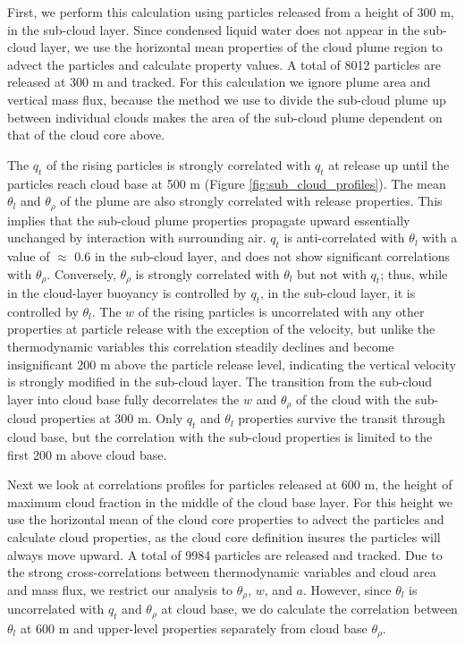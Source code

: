 \documentclass[acp]{copernicus}
\begin{document}
First, we perform this calculation using particles released from a height of 
300 m, in the sub-cloud layer.  Since condensed liquid water does not appear in 
the sub-cloud layer, we use the horizontal mean properties of the cloud plume 
region to advect the particles and calculate property values.  A total of 8012 
particles are released at 300 m and tracked.  For this calculation we ignore 
plume area and vertical mass flux, because the method we use to divide the 
sub-cloud plume up between individual clouds makes the area of the sub-cloud 
plume dependent on that of the cloud core above.

The $q_t$ of the rising particles is strongly correlated with $q_t$ at release 
up until the particles reach cloud base at 500 m (Figure 
\ref{fig:sub_cloud_profiles}).  The mean $\theta_l$ and $\theta_\rho$ of 
the plume are also strongly correlated with release properties.  This implies 
that the sub-cloud plume properties propagate upward essentially unchanged by 
interaction with surrounding air.  $q_t$ is anti-correlated with $\theta_l$ 
with a value of $\approx$ 0.6 in the sub-cloud layer, and does not show 
significant correlations with $\theta_\rho$.  Conversely, $\theta_\rho$ is 
strongly correlated with $\theta_l$ but not with $q_t$; thus, while in the 
cloud-layer buoyancy is controlled by $q_t$, in the sub-cloud layer, it is 
controlled by $\theta_l$.  The $w$ of the rising particles is uncorrelated 
with any other properties at particle release with the exception of the 
velocity, but unlike the thermodynamic variables this correlation steadily 
declines and become insignificant 200 m above the particle release level, 
indicating the vertical velocity is strongly modified in the sub-cloud layer.  
The transition from the sub-cloud layer into cloud base fully decorrelates the 
$w$ and $\theta_\rho$ of the cloud with the sub-cloud properties at 300 m.
Only $q_t$ and $\theta_l$ properties survive the transit through cloud base, 
but the correlation with the sub-cloud properties is limited to the first 200 m 
above cloud base.

Next we look at correlations profiles for particles released at 600 m, the 
height of maximum cloud fraction in the middle of the cloud base layer.
For this height we use the horizontal mean of the cloud core properties to 
advect the particles and calculate cloud properties, as the cloud core 
definition insures the particles will always move upward.  A total of 
9984 particles are released and tracked.  Due to the strong cross-correlations 
between thermodynamic variables and cloud area and mass flux, we restrict our 
analysis to $\theta_\rho$, $w$, and $a$.  However, since $\theta_l$ is 
uncorrelated with $q_t$ and $\theta_\rho$ at cloud base, we do calculate the 
correlation between $\theta_l$ at 600 m and upper-level properties separately 
from cloud base $\theta_\rho$.
\end{document}
